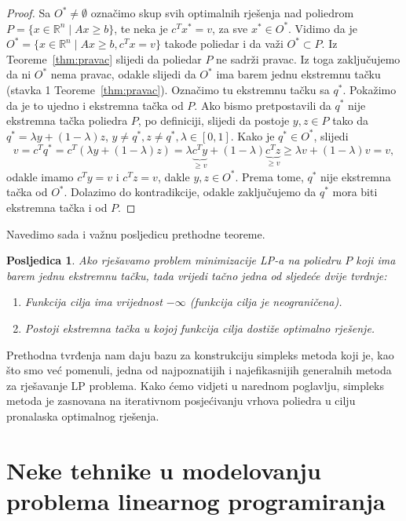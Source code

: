 \documentclass[b5paper, utf8, 11pt, colorlinks]{book}
\newtheorem{poslje}{Posljedica}[chapter]
\theoremstyle{definition}
\begin{document}
\begin{proof}
         Sa $O^* \not = \emptyset$ označimo skup svih optimalnih rješenja  nad poliedrom $P= \{ x \in \mathbb{R}^n \mid A x \geq b \}$, te neka je $c^T x^* = v$, za sve $x^* \in O^*$. Vidimo da je 
         $O^* = \{ x \in \mathbb{R}^n \mid A x \geq b, c^T x = v  \}$ takođe poliedar i da važi $O^* \subset P$. Iz Teoreme~\ref{thm:pravac} slijedi da poliedar $P$ ne sadrži pravac. Iz toga zaključujemo da ni $O^*$ nema pravac, odakle slijedi da $O^*$ ima barem jednu ekstremnu tačku (stavka 1 Teoreme~\ref{thm:pravac}). Označimo tu ekstremnu tačku sa $q^*$. Pokažimo da je to ujedno i ekstremna tačka od $P$.  Ako bismo pretpostavili da $q^*$ nije ekstremna tačka poliedra $P$, po definiciji, slijedi da postoje $y, z \in P$ tako da $q^* = \lambda y + ( 1 - \lambda ) z $, $y \neq q^*, z \neq q^*, \lambda \in [0, 1]$. Kako je $q^* \in O^*$, slijedi 
         $$ v = c^T q^* = c^T (  \lambda y + ( 1 - \lambda ) z ) = \lambda 
        \underbrace{ c^T y}_{ \geq v} + ( 1 - \lambda ) \underbrace{c^T z}_{\geq v} \geq \lambda v + (1 - \lambda) v = v,$$
        odakle imamo $c^T y = v$ i $c^T z = v$, dakle $y, z \in O^*$. Prema tome, $q^*$ nije ekstremna tačka od $O^*$. Dolazimo do kontradikcije, odakle zaključujemo da $q^*$ mora biti  ekstremna tačka i od  $P$.
\end{proof}
 

 Navedimo sada i važnu posljedicu prethodne teoreme.
 \begin{poslje}
Ako  rješavamo problem minimizacije LP-a na poliedru $P$ koji ima barem jednu ekstremnu tačku, tada vrijedi tačno jedna od sljedeće dvije tvrdnje:
   \begin{enumerate}
       \item Funkcija cilja ima vrijednost $- \infty$ (funkcija cilja je neograničena).
       \item Postoji ekstremna tačka u kojoj funkcija cilja dostiže optimalno rješenje. 
   \end{enumerate}
 \end{poslje}

 Prethodna tvrđenja nam daju bazu za konstrukciju simpleks metoda koji je, kao što smo već pomenuli, jedna od najpoznatijih i najefikasnijih generalnih metoda za rješavanje LP problema.
Kako ćemo vidjeti u narednom poglavlju, simpleks metoda je zasnovana na iterativnom posjećivanju vrhova poliedra  u cilju pronalaska optimalnog rješenja.

\section{Neke tehnike u modelovanju problema linearnog programiranja}
\end{document}
